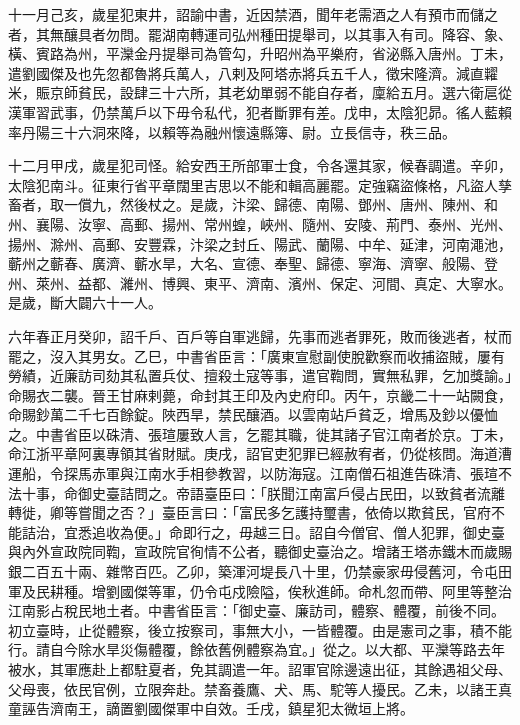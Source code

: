 \begin{pinyinscope}
 十一月己亥，歲星犯東井，詔諭中書，近因禁酒，聞年老需酒之人有預市而儲之者，其無釀具者勿問。罷湖南轉運司弘州種田提舉司，以其事入有司。降容、象、橫、賓路為州，平灤金丹提舉司為管勾，升昭州為平樂府，省泌縣入唐州。丁未，遣劉國傑及也先忽都魯將兵萬人，八剌及阿塔赤將兵五千人，徵宋隆濟。減直糶米，賑京師貧民，設肆三十六所，其老幼單弱不能自存者，廩給五月。選六衛扈從漢軍習武事，仍禁萬戶以下毋令私代，犯者斷罪有差。戊申，太陰犯昴。徭人藍賴率丹陽三十六洞來降，以賴等為融州懷遠縣簿、尉。立長信寺，秩三品。



 十二月甲戌，歲星犯司怪。給安西王所部軍士食，令各還其家，候春調遣。辛卯，太陰犯南斗。征東行省平章闊里吉思以不能和輯高麗罷。定強竊盜條格，凡盜人孳畜者，取一償九，然後杖之。是歲，汴梁、歸德、南陽、鄧州、唐州、陳州、和州、襄陽、汝寧、高郵、揚州、常州蝗，峽州、隨州、安陵、荊門、泰州、光州、揚州、滁州、高郵、安豐霖，汴梁之封丘、陽武、蘭陽、中牟、延津，河南澠池，蘄州之蘄春、廣濟、蘄水旱，大名、宣德、奉聖、歸德、寧海、濟寧、般陽、登州、萊州、益都、濰州、博興、東平、濟南、濱州、保定、河間、真定、大寧水。是歲，斷大闢六十一人。



 六年春正月癸卯，詔千戶、百戶等自軍逃歸，先事而逃者罪死，敗而後逃者，杖而罷之，沒入其男女。乙巳，中書省臣言：「廣東宣慰副使脫歡察而收捕盜賊，屢有勞績，近廉訪司劾其私置兵仗、擅殺土寇等事，遣官鞫問，實無私罪，乞加獎諭。」命賜衣二襲。晉王甘麻剌薨，命封其王印及內史府印。丙午，京畿二十一站闕食，命賜鈔萬二千七百餘錠。陜西旱，禁民釀酒。以雲南站戶貧乏，增馬及鈔以優恤之。中書省臣以硃清、張瑄屢致人言，乞罷其職，徙其諸子官江南者於京。丁未，命江浙平章阿裏專領其省財賦。庚戌，詔官吏犯罪已經赦宥者，仍從核問。海道漕運船，令探馬赤軍與江南水手相參教習，以防海寇。江南僧石祖進告硃清、張瑄不法十事，命御史臺詰問之。帝語臺臣曰：「朕聞江南富戶侵占民田，以致貧者流離轉徙，卿等嘗聞之否？」臺臣言曰：「富民多乞護持璽書，依倚以欺貧民，官府不能詰治，宜悉追收為便。」命即行之，毋越三日。詔自今僧官、僧人犯罪，御史臺與內外宣政院同鞫，宣政院官徇情不公者，聽御史臺治之。增諸王塔赤鐵木而歲賜銀二百五十兩、雜幣百匹。乙卯，築渾河堤長八十里，仍禁豪家毋侵舊河，令屯田軍及民耕種。增劉國傑等軍，仍令屯戍險隘，俟秋進師。命札忽而帶、阿里等整治江南影占稅民地土者。中書省臣言：「御史臺、廉訪司，體察、體覆，前後不同。初立臺時，止從體察，後立按察司，事無大小，一皆體覆。由是憲司之事，積不能行。請自今除水旱災傷體覆，餘依舊例體察為宜。」從之。以大都、平灤等路去年被水，其軍應赴上都駐夏者，免其調遣一年。詔軍官除邊遠出征，其餘遇祖父母、父母喪，依民官例，立限奔赴。禁畜養鷹、犬、馬、駝等人擾民。乙未，以諸王真童誣告濟南王，謫置劉國傑軍中自效。壬戌，鎮星犯太微垣上將。




\end{pinyinscope}
